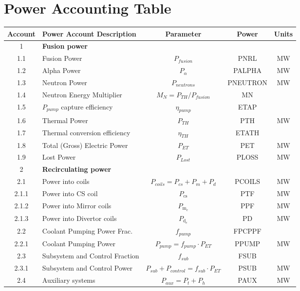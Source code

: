 
\newpage
\section{Power Accounting Table}

\begin{table}[ht!]								
\centering								
\begin{tabular}{|c|p{5cm}|c|c|c|}								
\hline								
\textbf{Account}	&	\textbf{Power Account Description}	&	\textbf{Parameter }	&	\textbf{Power}	&	\textbf{Units} \\
\hline								
1	&	\textbf{Fusion power}	&		&		&	\\
\hline
1.1	&	Fusion Power	&	$P_{{fusion}}$	&	PNRL	&	MW \\
1.2	&	Alpha Power	&	$P_{{\alpha}}$	&	PALPHA	&	MW \\
1.3	&	Neutron Power	&	$P_{{neutrons}}$	&	PNEUTRON	&	MW \\
1.4	&	Neutron Energy Multiplier	&	$M_N = P_{{TH}}/P_{{fusion}}$	&	MN	&	\\
1.5	&	$P_{pump}$ capture efficiency	&	$\eta_{{pump}}$	&	ETAP	&	\\
1.6	&	Thermal Power	&	$P_{{TH}}$	&	PTH	&	MW \\
1.7	&	Thermal conversion efficiency	&	$\eta_{{TH}}$	&	ETATH	&	\\
1.8	&	Total (Gross) Electric Power	&	$P_{{ET}}$	&	PET	&	MW \\
1.9	&	Lost Power	&	$P_{{Lost}}$	&	PLOSS	&	MW \\
\hline								
2	&	\textbf{Recirculating power}	&		&		&	\\
\hline
2.1	&	Power into coils 	&	$P_{{coils}} = P_{{cs}} + P_{{m}}+ P_{{d}}$	&	PCOILS	&	MW \\
2.1.1 & Power into CS coil & $P_{\text{cs}}$ & PTF & MW \\
2.1.2 & Power into Mirror coils & $P_{\text{m}_e}$ & PPF & MW \\
2.1.3 & Power into Divertor coils & $P_{\text{d}_e}$ & PD & MW \\
2.2	&	Coolant Pumping Power Frac.	&	$f_{{pump}}$	&	FPCPPF &	\\
2.2.1	&	Coolant Pumping Power	&	$P_{{pump}} = f_{{pump}} \cdot P_{{ET}}$	&	PPUMP	&	MW \\
2.3	&	Subsystem and Control Fraction	&	$f_{{sub}}$	&	FSUB	&	\\
2.3.1	&	Subsystem and Control Power	&	$P_{{sub}} + P_{{control}} = f_{{sub}} \cdot P_{{ET}}$	&	PSUB	&	MW \\
2.4	&	Auxiliary systems	&	$P_{{aux}} = P_{{t}} + P_{{h}}$	&	PAUX	&	MW \\

\end{tabular}
\end{table}
